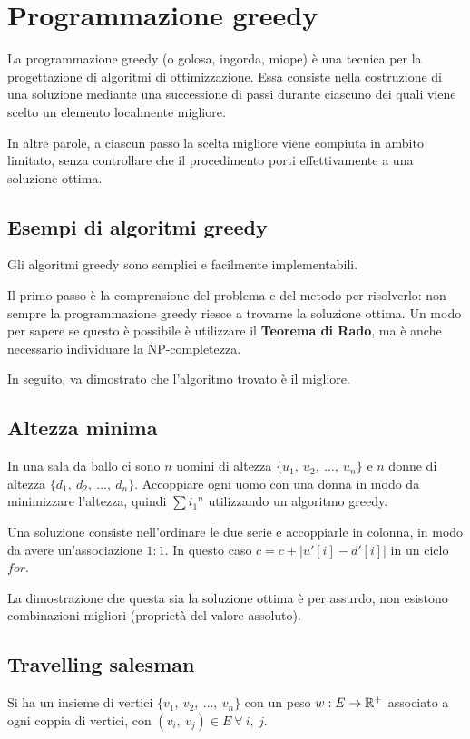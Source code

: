 \newpage
\section{Programmazione greedy}
La programmazione greedy (o golosa, ingorda, miope) è una tecnica per la progettazione di algoritmi di ottimizzazione. Essa consiste nella costruzione di una soluzione mediante una successione di passi durante ciascuno dei quali viene scelto un elemento localmente migliore.

In altre parole, a ciascun passo la scelta migliore viene compiuta in ambito limitato, senza controllare che il procedimento porti effettivamente a una soluzione ottima.

\subsection{Esempi di algoritmi greedy}
Gli algoritmi greedy sono semplici e facilmente implementabili.

Il primo passo è la comprensione del problema e del metodo per risolverlo: non sempre la programmazione greedy riesce a trovarne la soluzione ottima. Un modo per sapere se questo è possibile è utilizzare il \textbf{Teorema di Rado}, ma è anche necessario individuare la NP-completezza.

In seguito, va dimostrato che l'algoritmo trovato è il migliore.

\subsection{Altezza minima}
In una sala da ballo ci sono $n$ uomini di altezza $\{u_1,\ u_2,\ \dots,\ u_n\}$ e $n$ donne di altezza $\{d_1,\ d_2,\ \dots,\ d_n\}$. Accoppiare ogni uomo con una donna in modo da minimizzare l'altezza, quindi $\sum{i_1}^{n}$ utilizzando un algoritmo greedy.

Una soluzione consiste nell'ordinare le due serie e accoppiarle in colonna, in modo da avere un'associazione $1 : 1$. In questo caso $c = c + |u'[i] - d'[i]|$ in un ciclo $for$.

La dimostrazione che questa sia la soluzione ottima è per assurdo, non esistono combinazioni migliori (proprietà del valore assoluto). 

\subsection{Travelling salesman}
Si ha un insieme di vertici $\{v_1,\ v_2,\ \dots,\ v_n\}$ con un peso $w : E \rightarrow \mathbb{R}^+$ associato a ogni coppia di vertici, con $(v_i,\ v_j) \in E\ \forall\ i,\ j$.

